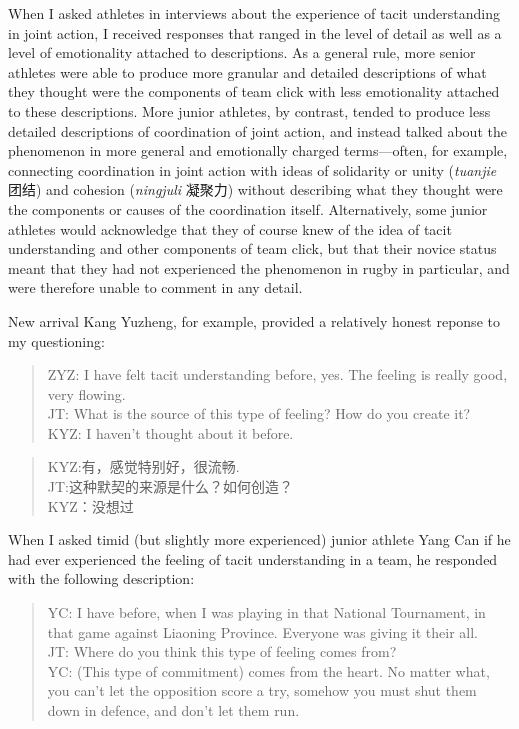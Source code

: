\begin{CJK}{UTF8}{gbsn}
When I asked athletes in interviews about the experience of tacit understanding in joint action, I received responses that ranged in the level of detail as well as a level of emotionality attached to descriptions.  As a general rule, more senior athletes were able to produce more granular and detailed descriptions of what they thought were the components of team click with less emotionality attached to these descriptions. More junior athletes, by contrast, tended to produce less detailed descriptions of coordination of joint action, and instead talked about the phenomenon in more general and emotionally charged terms---often, for example, connecting coordination in joint action with ideas of solidarity or unity (\textit{tuanjie} 团结) and cohesion (\textit{ningjuli} 凝聚力) without describing what they thought were the components or causes of the coordination itself.  Alternatively, some junior athletes would acknowledge that they of course knew of the idea of tacit understanding and other components of team click, but that their novice status meant that they had not experienced the phenomenon in rugby in particular, and were therefore unable to comment in any detail.

New arrival Kang Yuzheng, for example, provided a relatively honest reponse to my questioning:

\begin{quotation}
  ZYZ: I have felt tacit understanding before, yes.  The feeling is really good, very flowing. \\
  JT: What is the source of this type of feeling? How do you create it? \\
  KYZ: I haven't thought about it before.
\end{quotation}

\begin{quotation}
  KYZ:有，感觉特别好，很流畅. \\
  JT:这种默契的来源是什么？如何创造？\\
  KYZ：没想过
\end{quotation}


When I asked timid (but slightly more experienced) junior athlete Yang Can if he had ever experienced the feeling of tacit understanding in a team, he responded with the following description:

    \begin{quotation}
      YC: I have before, when I was playing in that National Tournament, in that game against Liaoning Province.  Everyone was giving it their all. \\
      JT: Where do you think this type of feeling comes from? \\
      YC: (This type of commitment) comes from the heart. No matter what, you can’t let the opposition score a try, somehow you must shut them down in defence, and don’t let them run.
    \end{quotation}


\end{CJK}
